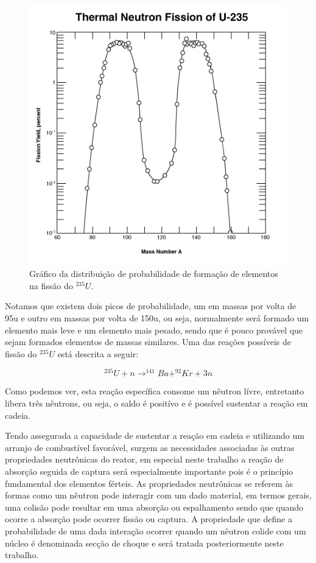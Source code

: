 \documentclass[
	12pt,				%
	openany,			%
	twoside,			%
	a4paper,			%
	english,			%
	french,				%
	spanish,			%
	brazil				%
	]{abntex2}
\begin{document}
\begin{figure}[htpb]
	\caption{\label{fisyield}Gráfico da distribuição de probabilidade de formação de elementos na fissão do $^{235}U$.}
	\begin{center}
	    \includegraphics[scale=0.5]{figs/fissionyield}
	\end{center}
\end{figure}

Notamos que existem dois picos de probabilidade, um em massas por
volta de 95u e outro em massas por volta de 150u, ou seja, normalmente
será formado um elemento mais leve e um elemento mais pesado, sendo
que é pouco provável que sejam formados elementos de massas similares.
Uma das reações possíveis de fissão do $^{235}U$ está descrita a
seguir:

\[
^{235}U+n\longrightarrow^{141}Ba+^{92}Kr+3n
\]

Como podemos ver, esta reação específica consome um nêutron lívre,
entretanto libera três nêutrons, ou seja, o saldo é positívo e é possível
sustentar a reação em cadeia. 

Tendo assegurada a capacidade de sustentar a reação em cadeia e utilizando
um arranjo de combustível favorável, surgem as necessidades associadas
às outras propriedades neutrônicas do reator, em especial neste trabalho
a reação de absorção seguida de captura será especialmente importante
pois é o princípio fundamental dos elementos férteis. As propriedades
neutrônicas se referem às formas como um nêutron pode interagir com
um dado material, em termos gerais, uma colisão pode resultar em uma
absorção ou espalhamento sendo que quando ocorre a absorção pode ocorrer
fissão ou captura. A propriedade que define a probabilidade de uma
dada interação ocorrer quando um nêutron colide com um núcleo é denominada
secção de choque e será tratada posteriormente neste trabalho.
\end{document}
